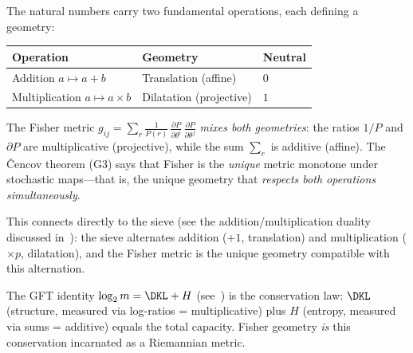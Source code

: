 \documentclass[12pt,a4paper]{article}
\begin{document}
\begin{remark}
\label{rem:two_geometries}
The natural numbers carry two fundamental operations,
each defining a geometry:
\begin{center}
\begin{tabular}{lll}
\toprule
\textbf{Operation} & \textbf{Geometry} & \textbf{Neutral} \\
\midrule
Addition $a \mapsto a + b$ & Translation (affine) & $0$ \\
Multiplication $a \mapsto a \times b$ & Dilatation (projective) & $1$ \\
\bottomrule
\end{tabular}
\end{center}

The Fisher metric
$g_{ij} = \sum_r \frac{1}{P(r)}\,
\frac{\partial P}{\partial\theta^i}\,
\frac{\partial P}{\partial\theta^j}$
\emph{mixes both geometries}: the ratios $1/P$ and $\partial P$
are multiplicative (projective), while the sum $\sum_r$ is
additive (affine).  The \v{C}encov theorem (G3) says that Fisher
is the \emph{unique} metric monotone under stochastic maps---that
is, the unique geometry that \emph{respects both operations
simultaneously}.

This connects directly to the sieve (see the addition/multiplication
duality discussed in~\cite{companion_M1}):
the sieve alternates addition ($+1$, translation) and
multiplication ($\times p$, dilatation), and the Fisher metric
is the unique geometry compatible with this alternation.

The GFT identity $\log_2 m = \DKL + H$
(see~\cite{companion_M1}) is the conservation law:
$\DKL$ (structure, measured via log-ratios = multiplicative) plus
$H$ (entropy, measured via sums = additive) equals the total
capacity.  Fisher geometry \emph{is} this conservation incarnated
as a Riemannian metric.
\end{remark}
\end{document}
